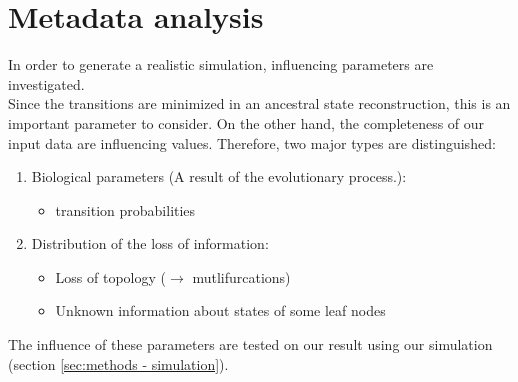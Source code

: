   \section{Metadata analysis}
    In order to generate a realistic simulation, influencing parameters are investigated. \\
    Since the transitions are minimized in an ancestral state reconstruction, this is an important 
      parameter to consider. On the other hand, the completeness of our input data are influencing 
      values. Therefore, two major types are distinguished:
    \begin{enumerate}
      \item Biological parameters (A result of the evolutionary process.):
        \begin{itemize}
          \item transition probabilities
        \end{itemize}
      \item Distribution of the loss of information:
        \begin{itemize}
          \item Loss of topology ($\rightarrow$ mutlifurcations)
          \item Unknown information about states of some leaf nodes
        \end{itemize}
    \end{enumerate}
    The influence of these parameters are tested on our result using our simulation (section 
      \ref{sec:methods - simulation}).
   
